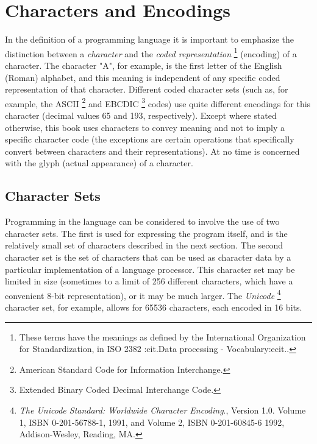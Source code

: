 \chapter{Characters and Encodings}\label{refencod}
 In the definition of a programming language it is important to
emphasize the distinction between a \emph{character} and the
\emph{coded representation}
\footnote{
These terms have the meanings as defined by the International
Organization for Standardization, in ISO 2382 :cit.Data processing
- Vocabulary:ecit..
}
(encoding) of a character.
The character "A", for example, is the first letter of the English
(Roman) alphabet, and this meaning is independent of any specific coded
representation of that character.
Different coded character sets (such as, for example, the ASCII
\footnote{
American Standard Code for Information Interchange.
}
and EBCDIC
\footnote{
Extended Binary Coded Decimal Interchange Code.
}
codes) use quite different encodings for this character (decimal
values 65 and 193, respectively).
 Except where stated otherwise, this
book
uses characters to convey meaning and not to imply a specific character
code (the exceptions are certain operations that specifically convert
between characters and their representations).
At no time is \nr{} concerned with the glyph (actual appearance) of
a character.
\section{Character Sets}
 Programming in the \nr{} language can be considered to involve the
use of two character sets.
The first is used for expressing the \nr{} program itself, and is the
relatively small set of characters described in the next section.
The second character set is the set of characters that can be used as
character data by a particular implementation of a \nr{} language
processor.
This character set may be limited in size (sometimes to a limit of 256
different characters, which have a convenient 8-bit representation), or
it may be much larger.  The \emph{Unicode}
\footnote{
\emph{The Unicode Standard: Worldwide Character Encoding}.,
Version 1.0.  Volume 1, ISBN 0-201-56788-1, 1991, and Volume 2, ISBN
0-201-60845-6 1992, Addison-Wesley, Reading, MA.
}
character set, for example, allows for 65536 characters, each encoded in
16 bits.
 
